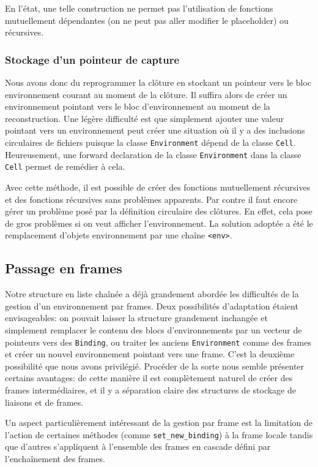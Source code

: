 \documentclass[a4paper,11pt]{article}
\begin{document}
En l'état, une telle construction ne permet pas l'utilisation de fonctions
mutuellement dépendantes (on ne peut pas aller modifier le placeholder) ou
récursives.

\subsubsection{Stockage d'un pointeur de capture}

Nous avons donc du reprogrammer la clôture en stockant un pointeur vers le bloc
environnement courant au moment de la clôture. Il suffira alors de créer un
environnement pointant vers le bloc d'environnement au moment de la reconstruction.
Une légère difficulté est que simplement ajouter une valeur pointant vers un
environnement peut créer une situation où il y a des inclusions circulaires de
fichiers puisque la classe \texttt{Environment} dépend de la classe \texttt{Cell}.
Heureusement, une forward declaration de la classe \texttt{Environment} dans la classe
\texttt{Cell} permet de remédier à cela.

Avec cette méthode, il est possible de créer des fonctions mutuellement
récursives et des fonctions récursives sans problèmes apparents. Par contre il
faut encore gérer un problème posé par la définition circulaire des clôtures.
En effet, cela pose de gros problèmes si on veut afficher l'environnement. La
solution adoptée a été le remplacement d'objets environnement par une chaîne
\texttt{<env>}.

\subsection{Passage en frames}

Notre structure en liste chaînée a déjà grandement abordée les difficultés de la
gestion d'un environnement par frames. Deux possibilités d'adaptation étaient
envisageables: on pouvait laisser la structure grandement inchangée et
simplement remplacer le contenu des blocs d'environnements par un vecteur de
pointeurs vers des \texttt{Binding}, ou traiter les anciens
\texttt{Environment} comme des frames et créer un nouvel environnement pointant
vers une frame. C'est la deuxième possibilité que nous avons privilégié.
Procéder de la sorte nous semble présenter certains avantages: de cette manière
il est complètement naturel de créer des frames intermédiaires, et il y a
séparation claire des structures de stockage de liaisons et de frames.

Un aspect particulièrement intéressant de la gestion par frame est la limitation
de l'action de certaines méthodes (comme \texttt{set\_new\_binding}) à la frame
locale tandis que d'autres s'appliquent à l'ensemble des frames en cascade
défini par l'enchaînement des frames.
\end{document}
